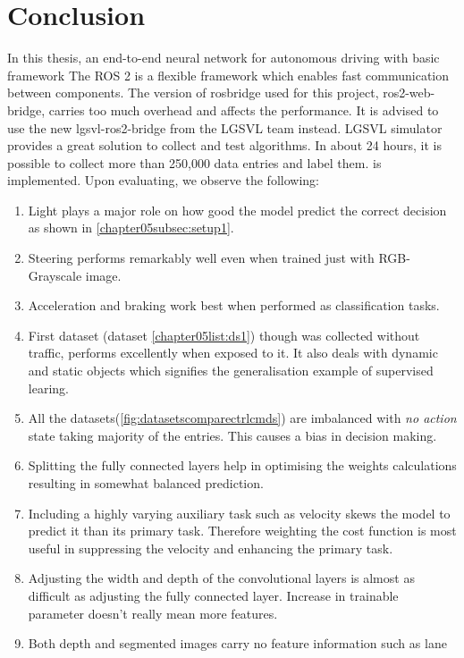 \chapter{Conclusion}

In this thesis, an end-to-end neural network for autonomous driving with basic framework
The ROS 2 is a flexible framework which enables fast communication between components. The version of rosbridge used for this project, ros2-web-bridge, carries too much overhead and affects the performance. It is advised to use the new lgsvl-ros2-bridge from the LGSVL team instead.
LGSVL simulator provides a great solution to collect and test algorithms. In about 24 hours, it is possible to collect more than 250,000 data entries and label them.
is implemented. Upon evaluating, we observe the following:
\begin{enumerate}
    \item Light plays a major role on how good the model predict the correct decision as
        shown in \ref{chapter05subsec:setup1}.
    \item Steering performs remarkably well even when trained just with RGB-Grayscale image.
    \item Acceleration and braking work best when performed as classification tasks.
    \item First dataset (dataset \ref{chapter05list:ds1}) though was collected without traffic,
        performs excellently when exposed to it. It also deals with dynamic and static objects which signifies the generalisation example of supervised learing.
    \item All the datasets(\ref{fig:datasetscomparectrlcmds}) are imbalanced with
        \textit{no action} state taking majority of the entries. This causes a bias in
        decision making.
    \item Splitting the fully connected layers help in optimising the weights calculations
        resulting in somewhat balanced prediction.
    \item Including a highly varying auxiliary task such as velocity skews the model to
        predict it than its primary task. Therefore weighting the cost function is most
        useful in suppressing the velocity and enhancing the primary task.
    \item Adjusting the width and depth of the convolutional layers is almost as difficult
        as adjusting the fully connected layer. Increase in trainable parameter doesn't
        really mean more features.
    \item Both depth and segmented images carry no feature information such as lane

\end{enumerate}
